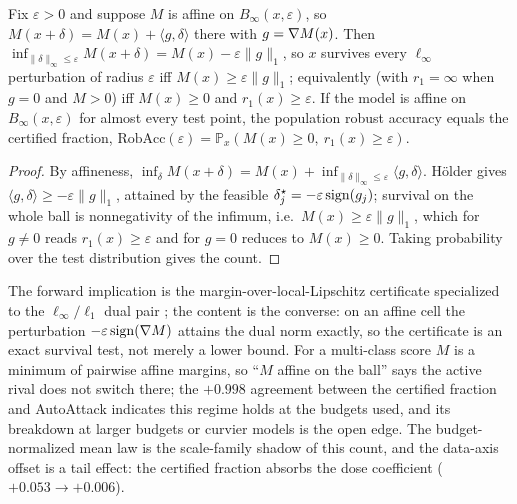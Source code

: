 \begin{proposition}\label{prop:count-app}
Fix $\varepsilon>0$ and suppose $M$ is affine on $B_\infty(x,\varepsilon)$, so
$M(x+\delta)=M(x)+\langle g,\delta\rangle$ there with $g=\nabla M(x)$. Then
$\inf_{\lVert\delta\rVert_\infty\le\varepsilon}M(x+\delta)=M(x)-\varepsilon\lVert g\rVert_1$,
so $x$ survives every $\ell_\infty$ perturbation of radius $\varepsilon$ iff
$M(x)\ge\varepsilon\lVert g\rVert_1$; equivalently (with $r_1=\infty$ when $g=0$
and $M>0$) iff $M(x)\ge0$ and $r_1(x)\ge\varepsilon$. If the model is affine on
$B_\infty(x,\varepsilon)$ for almost every test point, the population robust
accuracy equals the certified fraction,
$\mathrm{RobAcc}(\varepsilon)=\mathbb P_x(M(x)\ge0,\ r_1(x)\ge\varepsilon)$.
\end{proposition}
\begin{proof}
By affineness,
$\inf_\delta M(x+\delta)=M(x)+\inf_{\lVert\delta\rVert_\infty\le\varepsilon}\langle g,\delta\rangle$.
H\"older gives $\langle g,\delta\rangle\ge-\varepsilon\lVert g\rVert_1$, attained
by the feasible $\delta^\star_j=-\varepsilon\,\mathrm{sign}(g_j)$; survival on the whole
ball is nonnegativity of the infimum, i.e.\ $M(x)\ge\varepsilon\lVert g\rVert_1$,
which for $g\neq0$ reads $r_1(x)\ge\varepsilon$ and for $g=0$ reduces to
$M(x)\ge0$. Taking probability over the test distribution gives the count.
\end{proof}

\begin{remark}[Reading]\label{rem:count-app}
The forward implication is the margin-over-local-Lipschitz certificate
specialized to the $\ell_\infty/\ell_1$ dual pair
\citep{hein2017formal,tsuzuku2018lipschitz}; the content is the converse: on an
affine cell the perturbation $-\varepsilon\,\mathrm{sign}(\nabla M)$ attains the dual norm
exactly, so the certificate is an exact survival test, not merely a lower bound.
For a multi-class score $M$ is a minimum of pairwise affine margins, so ``$M$
affine on the ball'' says the active rival does not switch there; the $+0.998$
agreement between the certified fraction and AutoAttack indicates this regime
holds at the budgets used, and its breakdown at larger budgets or curvier models
is the open edge. The budget-normalized mean law is the scale-family shadow of
this count, and the data-axis offset is a tail effect: the certified fraction
absorbs the dose coefficient ($+0.053\to+0.006$).
\end{remark}
